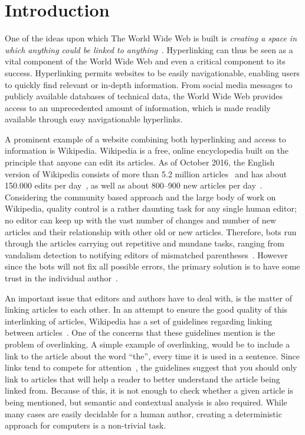 \chapter{Introduction}\label{ch:introduction}
One of the ideas upon which The World Wide Web is built is \emph{creating a space in which anything could be linked to anything}~\cite[ch.~1, p.~4]{Weaving-the-web}. Hyperlinking can thus be seen as a vital component of the World Wide Web and even a critical component to its success. Hyperlinking permits websites to be easily navigationable, enabling users to quickly find relevant or in-depth information. From social media messages to publicly available databases of technical data, the World Wide Web provides access to an unprecedented amount of information, which is made readily available through easy navigationable hyperlinks.

A prominent example of a website combining both hyperlinking and access to information is Wikipedia. Wikipedia is a free, online encyclopedia built on the principle that anyone can edit its articles. As of October 2016, the English version of Wikipedia consists of more than 5.2 million articles~\cite{wiki-about} and has about 150.000 edits per day~\cite{wiki-num-edits}, as well as about 800--900 new articles per day~\cite{wmcharts}. Considering the community based approach and the large body of work on Wikipedia, quality control is a rather daunting task for any single human editor; no editor can keep up with the vast number of changes and number of new articles and their relationship with other old or new articles. Therefore, bots run through the articles carrying out repetitive and mundane tasks, ranging from vandalism detection to notifying editors of mismatched parentheses~\cite{wiki-bots}. However since the bots will not fix all possible errors, the primary solution is to have some trust in the individual author~\cite{wiki-editor-guidelines}.

An important issue that editors and authors have to deal with, is the matter of linking articles to each other. In an attempt to ensure the good quality of this interlinking of articles, Wikipedia has a set of guidelines regarding linking between articles~\cite{wiki-manual-of-style-overlinking}. One of the concerns that these guidelines mention is the problem of overlinking. A simple example of overlinking, would be to include a link to the article about the word \enquote{the}, every time it is used in a sentence. Since links tend to compete for attention~\cite{hyperlink-structure-using-logs}, the guidelines suggest that you should only link to articles that will help a reader to better understand the article being linked from. Because of this, it is not enough to check whether a given article is being mentioned, but semantic and contextual analysis is also required. While many cases are easily decidable for a human author, creating a deterministic approach for computers is a non-trivial task.


